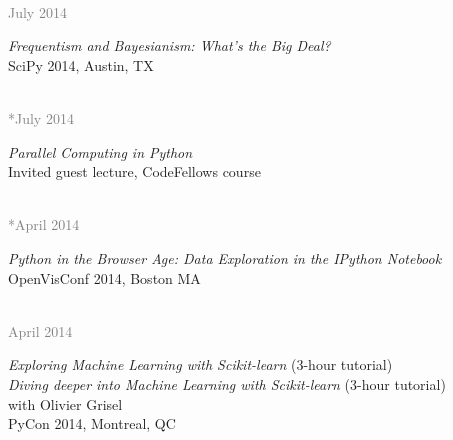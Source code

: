 \documentclass{article} %
\newlength\sidebarwidth
\newcommand{\dateonly}[2][]
	 {\begin{minipage}{\textwidth}
	 \vspace*{.4\baselineskip}
         \nopagebreak\hspace{0in}%
         \nopagebreak\begin{minipage}[t]{\sidebarwidth - .2cm}
         \raggedleft {~}
         {\\[-\baselineskip] \textcolor{gray}{\footnotesize #1}}
	 \end{minipage}%
	 \hfill
	 \begin{minipage}[t]{\linewidth - \sidebarwidth}
	 #2%
	 \end{minipage}%
	 \vspace*{.2\baselineskip plus 1\baselineskip minus
	 .2\baselineskip}%
	 \end{minipage}}
\begin{document}
  \dateonly[July 2014]{
    {\it Frequentism and Bayesianism: What's the Big Deal?}\\
    SciPy 2014, Austin, TX
  }

  \dateonly[**July 2014]{
    {\it Parallel Computing in Python}\\
    Invited guest lecture, CodeFellows course
  }

  \dateonly[**April 2014]{
    {\it Python in the Browser Age: Data Exploration in the IPython Notebook}\\
    OpenVisConf 2014, Boston MA
  }

  \dateonly[April 2014]{
    {\it Exploring Machine Learning with Scikit-learn} (3-hour tutorial)\\
    {\it Diving deeper into Machine Learning with Scikit-learn} (3-hour tutorial)\\
    with Olivier Grisel\\
    PyCon 2014, Montreal, QC
  }
\end{document}
